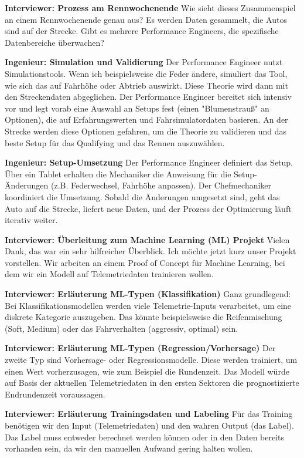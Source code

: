 \textbf{Interviewer: Prozess am Rennwochenende}
Wie sieht dieses Zusammenspiel an einem Rennwochenende genau aus? Es werden Daten gesammelt, die Autos sind auf der Strecke. Gibt es mehrere Performance Engineers, die spezifische Datenbereiche überwachen?

\textbf{Ingenieur: Simulation und Validierung}
Der Performance Engineer nutzt Simulationstools. Wenn ich beispielsweise die Feder ändere, simuliert das Tool, wie sich das auf Fahrhöhe oder Abtrieb auswirkt. Diese Theorie wird dann mit den Streckendaten abgeglichen. Der Performance Engineer bereitet sich intensiv vor und legt vorab eine Auswahl an Setups fest (einen "Blumenstrauß" an Optionen), die auf Erfahrungswerten und Fahrsimulatordaten basieren. An der Strecke werden diese Optionen gefahren, um die Theorie zu validieren und das beste Setup für das Qualifying und das Rennen auszuwählen.

\textbf{Ingenieur: Setup-Umsetzung}
Der Performance Engineer definiert das Setup. Über ein Tablet erhalten die Mechaniker die Anweisung für die Setup-Änderungen (z.B. Federwechsel, Fahrhöhe anpassen). Der Chefmechaniker koordiniert die Umsetzung. Sobald die Änderungen umgesetzt sind, geht das Auto auf die Strecke, liefert neue Daten, und der Prozess der Optimierung läuft iterativ weiter.

\textbf{Interviewer: Überleitung zum Machine Learning (ML) Projekt}
Vielen Dank, das war ein sehr hilfreicher Überblick. Ich möchte jetzt kurz unser Projekt vorstellen. Wir arbeiten an einem Proof of Concept für Machine Learning, bei dem wir ein Modell auf Telemetriedaten trainieren wollen.

\textbf{Interviewer: Erläuterung ML-Typen (Klassifikation)}
Ganz grundlegend: Bei Klassifikationsmodellen werden viele Telemetrie-Inputs verarbeitet, um eine diskrete Kategorie auszugeben. Das könnte beispielsweise die Reifenmischung (Soft, Medium) oder das Fahrverhalten (aggressiv, optimal) sein.

\textbf{Interviewer: Erläuterung ML-Typen (Regression/Vorhersage)}
Der zweite Typ sind Vorhersage- oder Regressionsmodelle. Diese werden trainiert, um einen Wert vorherzusagen, wie zum Beispiel die Rundenzeit. Das Modell würde auf Basis der aktuellen Telemetriedaten in den ersten Sektoren die prognostizierte Endrundenzeit voraussagen.

\textbf{Interviewer: Erläuterung Trainingsdaten und Labeling}
Für das Training benötigen wir den Input (Telemetriedaten) und den wahren Output (das Label). Das Label muss entweder berechnet werden können oder in den Daten bereits vorhanden sein, da wir den manuellen Aufwand gering halten wollen.

